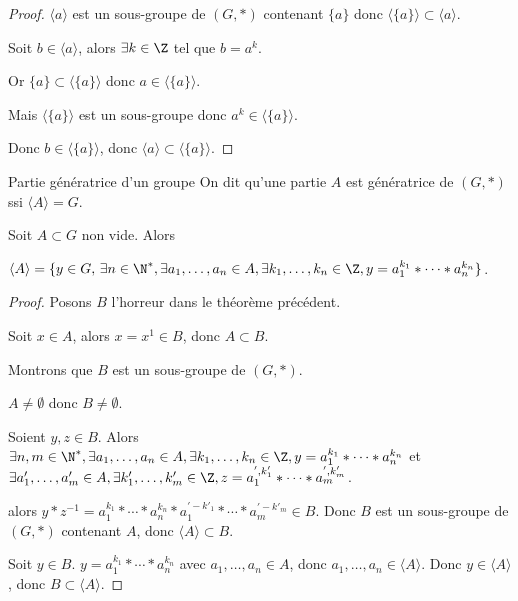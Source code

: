 \begin{proof}
    $\langle a \rangle$ est un sous-groupe de $(G, \ast)$ contenant $\{a\}$ donc $\langle \{a\} \rangle \subset \langle a \rangle$.

    Soit $b \in \langle a \rangle$, alors $\exists k \in \Z$ tel que $b = a^k$.

    Or $\{a\} \subset \langle \{a\} \rangle$ donc $a \in \langle \{a\} \rangle$.

    Mais $\langle \{a\} \rangle$ est un sous-groupe donc $a^k \in \langle \{a\} \rangle$.

    Donc $b \in \langle \{a\} \rangle$, donc $\langle a \rangle \subset \langle \{a\} \rangle$.
\end{proof}

\begin{definition}{Partie génératrice d'un groupe}{}
    On dit qu'une partie $A$ est génératrice de $(G, \ast)$ ssi $\langle A \rangle = G$.
\end{definition}

\begin{theoreme}{}{}
    Soit $A \subset G$ non vide. Alors 
    
    $\langle A \rangle = \{y \in G, \, \exists n \in \N^*, \exists a_1, \ldots, a_n \in A, \exists k_1, \ldots, k_n \in \Z, y = a_1^{k_1} \ast \cdots \ast a_n^{k_n}\}$.
\end{theoreme}


\begin{proof}
    Posons $B$ l'horreur dans le théorème précédent. 

    Soit $x \in A$, alors $x = x^1 \in B$, donc $A \subset B$.

    Montrons que $B$ est un sous-groupe de $(G, \ast)$.

    $A \neq \emptyset$ donc $B \neq \emptyset$.

    Soient $y, z \in B$. Alors 
    $\exists n, m \in \N^*, \exists a_1, \ldots, a_n \in A, \exists k_1, \ldots, k_n \in \Z, y = a_1^{k_1} \ast \cdots \ast a_n^{k_n}$
    et $\exists a'_1, \ldots, a'_m \in A, \exists k'_1, \ldots, k'_m \in \Z, z = a_1^{', k'_1} \ast \cdots \ast a_m^{', k'_m}$.

    alors $y \ast z^{-1} = a_1^{k_1} \ast \cdots \ast a_n^{k_n} \ast a_1^{' -k'_1} \ast \cdots \ast a_m^{' -k'_m} \in B$.
    Donc $B$ est un sous-groupe de $(G, \ast)$ contenant $A$, donc $\langle A \rangle \subset B$.

    Soit $y \in B$. 
    $y = a_1^{k_1} \ast \cdots \ast a_n^{k_n}$ avec $a_1, \ldots, a_n \in A$, donc $a_1, \ldots, a_n \in \langle A \rangle$.
    Donc $y \in \langle A \rangle$, donc $B \subset \langle A \rangle$.
\end{proof}

